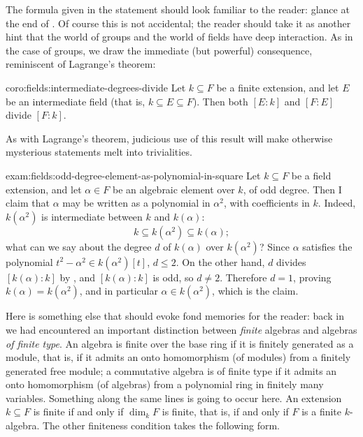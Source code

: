 The formula given in the statement should look familiar to the reader:
glance at the end of
. Of course
this is not accidental; the reader should take it as another hint that
the world of groups and the world of fields have deep interaction. As
in the case of groups, we draw the immediate (but powerful)
consequence, reminiscent of Lagrange's theorem:
\begin{coro}{}{coro:fields:intermediate-degrees-divide}
  Let $k \subseteq F$ be a finite extension, and let $E$ be an
  intermediate field (that is, $k \subseteq E \subseteq F$). Then both
  $[E : k]$ and $[F : E]$ divide $[F : k]$.
\end{coro}
As with Lagrange's theorem, judicious use of this result will make
otherwise mysterious statements melt into trivialities.
\begin{exam}{}{exam:fields:odd-degree-element-as-polynomial-in-square}
  Let $k \subseteq F$ be a field extension, and let $\alpha \in F$ be
  an algebraic element over $k$, of odd degree. Then I claim that
  $\alpha$ may be written as a polynomial in $\alpha^2$, with
  coefficients in $k$.  Indeed, $k(\alpha^2)$ is intermediate between
  $k$ and $k(\alpha)$:
  \[
    k \subseteq k(\alpha^2) \subseteq k(\alpha);
  \]
  what can we say about the degree $d$ of $k(\alpha)$ over
  $k(\alpha^2)$?  Since $\alpha$ satisfies the polynomial
  $t^2 - \alpha^2 \in k(\alpha^2)[t]$, $d \leq 2$. On the other hand,
  $d$ divides $[k(\alpha) : k]$ by , and
  $[k(\alpha) : k]$ is odd, so $d \neq 2$.  Therefore $d = 1$, proving
  $k(\alpha) = k(\alpha^2)$, and in particular
  $\alpha \in k(\alpha^2)$, which is the claim.
\end{exam}
Here is something else that should evoke fond memories for the reader:
back in  we
had encountered an important distinction between \emph{finite}
algebras and algebras \emph{of finite type}. An algebra is finite over
the base ring if it is finitely generated as a module, that is, if it
admits an onto homomorphism (of modules) from a finitely generated
free module; a commutative algebra is of finite type if it admits an
onto homomorphism (of algebras) from a polynomial ring in finitely
many variables.  Something along the same lines is going to occur
here. An extension $k \subseteq F$ is finite if and only if $\dim_k F$
is finite, that is, if and only if $F$ is a finite $k$-algebra. The
other finiteness condition takes the following form.
